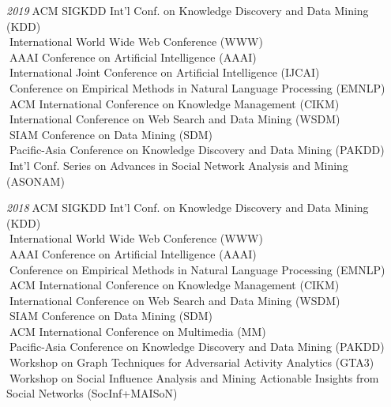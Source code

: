 \documentclass[10pt]{article}
\newenvironment{myindentpar}[1]%
{\begin{list}{}%
         {\setlength{\leftmargin}{#1}}%
         \item[]%
}
{\end{list}}
\newcounter{list}
\begin{document}
\begin{myindentpar}{0.75cm}
{\hspace{-0.75cm}\emph{2019}\textcolor{white}{.}ACM SIGKDD Int'l Conf. on Knowledge Discovery and Data Mining (KDD) \\
\textcolor{white}{.}International World Wide Web Conference (WWW) \\
\textcolor{white}{.}AAAI Conference on Artificial Intelligence (AAAI) \\
\textcolor{white}{.}International Joint Conference on Artificial Intelligence (IJCAI) \\
\textcolor{white}{.}Conference on Empirical Methods in Natural Language Processing (EMNLP) \\
\textcolor{white}{.}ACM International Conference on Knowledge Management (CIKM) \\
\textcolor{white}{.}International Conference on Web Search and Data Mining (WSDM) \\
\textcolor{white}{.}SIAM Conference on Data Mining (SDM) \\
\textcolor{white}{.}Pacific-Asia Conference on Knowledge Discovery and Data Mining (PAKDD) \\
\textcolor{white}{.}Int'l Conf. Series on Advances in Social Network Analysis and Mining (ASONAM)
	
\hspace{-0.75cm}\emph{2018}\textcolor{white}{.}ACM SIGKDD Int'l Conf. on Knowledge Discovery and Data Mining (KDD) \\
\textcolor{white}{.}International World Wide Web Conference (WWW) \\
\textcolor{white}{.}AAAI Conference on Artificial Intelligence (AAAI) \\
\textcolor{white}{.}Conference on Empirical Methods in Natural Language Processing (EMNLP) \\
\textcolor{white}{.}ACM International Conference on Knowledge Management (CIKM) \\
\textcolor{white}{.}International Conference on Web Search and Data Mining (WSDM) \\
\textcolor{white}{.}SIAM Conference on Data Mining (SDM) \\
\textcolor{white}{.}ACM International Conference on Multimedia (MM) \\
\textcolor{white}{.}Pacific-Asia Conference on Knowledge Discovery and Data Mining (PAKDD) \\
\textcolor{white}{.}Workshop on Graph Techniques for Adversarial Activity Analytics (GTA3) \\
\textcolor{white}{.}Workshop on Social Influence Analysis and Mining Actionable Insights from Social Networks (SocInf+MAISoN)

}
\end{myindentpar}
\end{document}
